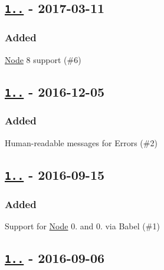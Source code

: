 \subsection*{\href{https://github.com/malept/sumchecker/compare/v1.3.0...v1.3.1}{\tt 1..} -\/ 2017-\/03-\/11}

\subsubsection*{Added}


\begin{DoxyItemize}
\item \mbox{\hyperlink{classNode}{Node}} 8 support (\#6)
\end{DoxyItemize}

\subsection*{\href{https://github.com/malept/sumchecker/compare/v1.2.0...v1.3.0}{\tt 1..} -\/ 2016-\/12-\/05}

\subsubsection*{Added}


\begin{DoxyItemize}
\item Human-\/readable messages for Errors (\#2)
\end{DoxyItemize}

\subsection*{\href{https://github.com/malept/sumchecker/compare/v1.1.0...v1.2.0}{\tt 1..} -\/ 2016-\/09-\/15}

\subsubsection*{Added}


\begin{DoxyItemize}
\item Support for \mbox{\hyperlink{classNode}{Node}} 0. and 0. via Babel (\#1)
\end{DoxyItemize}

\subsection*{\href{https://github.com/malept/sumchecker/compare/v1.0.0...v1.1.0}{\tt 1..} -\/ 2016-\/09-\/06}

